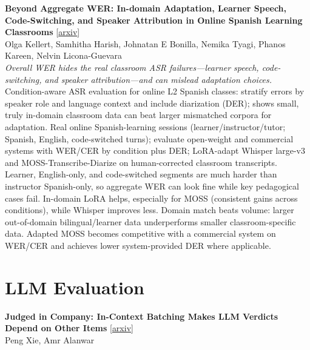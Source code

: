 \documentclass[12pt,letterpaper]{article}
\begin{document}
\medskip

{\small\textbf{Beyond Aggregate WER: In-domain Adaptation, Learner Speech, Code-Switching, and Speaker Attribution in Online Spanish Learning Classrooms}} {\scriptsize[\href{https://arxiv.org/abs/2610.38016}{arxiv}]}\\
{\scriptsize Olga Kellert, Samhitha Harish, Johnatan E Bonilla, Nemika Tyagi, Phanos Kareen, Nelvin Licona-Guevara}\\

{\small\textit{Overall WER hides the real classroom ASR failures---learner speech, code-switching, and speaker attribution---and can mislead adaptation choices.}}\\[1pt]
{\footnotesize Condition-aware ASR evaluation for online L2 Spanish classes: stratify errors by speaker role and language context and include diarization (DER); shows small, truly in-domain classroom data can beat larger mismatched corpora for adaptation. Real online Spanish-learning sessions (learner/instructor/tutor; Spanish, English, code-switched turns); evaluate open-weight and commercial systems with WER/CER by condition plus DER; LoRA-adapt Whisper large-v3 and MOSS-Transcribe-Diarize on human-corrected classroom transcripts. Learner, English-only, and code-switched segments are much harder than instructor Spanish-only, so aggregate WER can look fine while key pedagogical cases fail. In-domain LoRA helps, especially for MOSS (consistent gains across conditions), while Whisper improves less. Domain match beats volume: larger out-of-domain bilingual/learner data underperforms smaller classroom-specific data. Adapted MOSS becomes competitive with a commercial system on WER/CER and achieves lower system-provided DER where applicable.}

\medskip


\section*{LLM Evaluation}

{\small\textbf{Judged in Company: In-Context Batching Makes LLM Verdicts Depend on Other Items}} {\scriptsize[\href{https://arxiv.org/abs/2610.40241}{arxiv}]}\\
{\scriptsize Peng Xie, Amr Alanwar}\\
\end{document}
